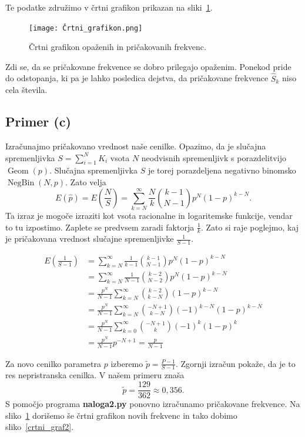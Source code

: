 \documentclass[a4paper,11pt]{article}
\DeclareMathOperator{\Geom}{Geom}
\DeclareMathOperator{\NegBin}{NegBin}
\begin{document}
\noindent Te podatke združimo v črtni grafikon prikazan na sliki~\ref{crtni_graf1}.

\begin{figure}[H]
    \centering
    \texttt{[image: Črtni\_grafikon.png]}
    \caption{Črtni grafikon opaženih in pričakovanih frekvenc.}
    \label{crtni_graf1}
\end{figure}

Zdi se, da se pričakovane frekvence se dobro prilegajo opaženim. Ponekod pride do odstopanja, 
ki pa je lahko posledica dejstva, da pričakovane frekvence $\hat{S}_k$ niso cela števila.

\subsection*{Primer (c)}

Izračunajmo pričakovano vrednost naše cenilke.
Opazimo, da je slučajna spremenljivka $S = \sum_{i=1}^N K_i$ vsota $N$ neodvisnih spremenljivk s porazdelitvijo $\Geom(p)$.
Slučajna spremenljivka $S$ je torej porazdeljena negativno binomsko $\NegBin(N,p)$.
Zato velja
\[E(\hat{p}) = E\left(\frac{N}{S}\right) = \sum_{k=N}^{\infty} \frac{N}{k} \binom{k-1}{N-1}p^N(1-p)^{k-N}.\]
Ta izraz je mogoče izraziti kot vsota racionalne in logaritemske funkcije, vendar to tu izpostimo. 
Zaplete se predvsem zaradi faktorja $\frac{1}{k}$. 
Zato si raje poglejmo, kaj je pričakovana vrednost slučajne spremenljivke $\frac{1}{S-1}$. 

\begin{align*}
E\left(\frac{1}{S-1}\right) &= \sum_{k=N}^{\infty} \frac{1}{k-1} \binom{k-1}{N-1}p^N(1-p)^{k-N} \\
    &= \sum_{k=N}^{\infty} \frac{1}{N-1} \binom{k-2}{N-2}p^N(1-p)^{k-N} \\
    &= \frac{p^N}{N-1} \sum_{k=N}^{\infty} \binom{k-2}{k-N}(1-p)^{k-N} \\
    &= \frac{p^N}{N-1} \sum_{k=N}^{\infty} \binom{-N+1}{k-N}(-1)^{k-N}(1-p)^{k-N} \\
    &= \frac{p^N}{N-1} \sum_{k=0}^{\infty} \binom{-N+1}{k}(-1)^k(1-p)^k \\
    &= \frac{p^N}{N-1} p^{-N+1} = \frac{p}{N-1}
\end{align*}

Za novo cenilko parametra $p$ izberemo $\tilde{p} = \frac{P-1}{S-1}$. 
Zgornji izračun pokaže, da je to res nepristranska cenilka.
V našem primeru znaša
\[\tilde{p} = \frac{129}{362} \approx 0,356.\]
S pomočjo programa \textbf{naloga2.py} ponovno izračunamo pričakovane frekvence. 
Na sliko~\ref{crtni_graf1} dorišemo še črtni grafikon novih frekvenc in tako dobimo sliko~\ref{crtni_graf2}.
\end{document}
